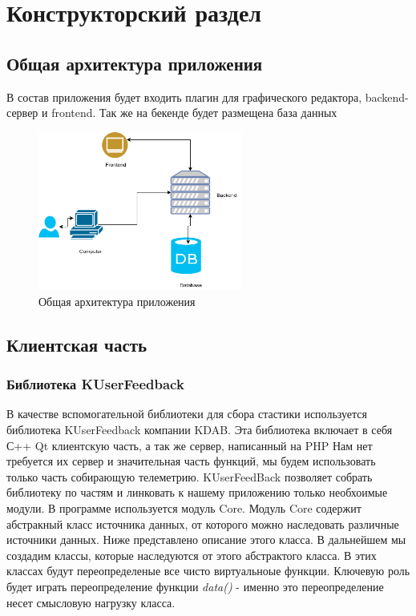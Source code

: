 \chapter{Конструкторский раздел}
\label{cha:design}
\section{Общая архитектура приложения}
В состав приложения будет входить плагин для графического редактора, backend-сервер и frontend. Так же на бекенде будет размещена база данных
\begin{figure}[h!]
	\centering
	\includegraphics[width=0.6\textwidth]{img/diagram1.png}
	\caption{Общая архитектура приложения}
	\label{fig:spire01}
\end{figure}
\section{Клиентская часть}
\subsection{Библиотека KUserFeedback}
В качестве вспомогательной библиотеки для сбора стастики используется библиотека KUserFeedback компании KDAB. Эта библиотека включает в себя С++ Qt клиентскую часть, а так же сервер, написанный на PHP\cite{book3} Нам нет требуется их сервер и значительная часть функций, мы будем использовать только часть собирающую телеметрию. KUserFeedBack позволяет  собрать библиотеку по частям и линковать к нашему приложению только необхоимые модули. В программе используется модуль Core. Модуль Core содержит абстракный класс источника данных, от которого можно наследовать различные источники данных. Ниже представлено описание этого класса. В дальнейшем мы создадим классы, которые наследуются от этого абстрактого класса. В этих классах будут переопределеные все чисто виртуальноые функции. Ключевую роль будет играть переопределение функции \textit{data()} - именно это переопределение несет смысловую нагрузку класса.

